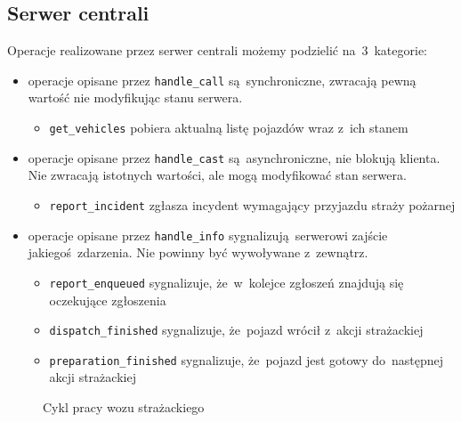\documentclass{article}
\begin{document}
\subsection{Serwer centrali}
Operacje realizowane przez serwer centrali możemy podzielić na~3~kategorie:
\begin{itemize}
	\item operacje opisane przez \texttt{handle\_call} są~synchroniczne, zwracają pewną wartość nie modyfikując stanu serwera.
	\begin{itemize}
		\item \texttt{get\_vehicles} pobiera aktualną listę pojazdów wraz z~ich stanem
	\end{itemize}

	\item operacje opisane przez \texttt{handle\_cast} są~asynchroniczne, nie blokują klienta. Nie zwracają istotnych wartości, ale mogą modyfikować stan serwera.
	\begin{itemize}
		\item \texttt{report\_incident} zgłasza incydent wymagający przyjazdu straży pożarnej
	\end{itemize}

	\item operacje opisane przez \texttt{handle\_info} sygnalizują serwerowi zajście jakiegoś zdarzenia. Nie powinny być wywoływane z~zewnątrz.
	\begin{itemize}
		\item \texttt{report\_enqueued} sygnalizuje, że~w~kolejce zgłoszeń znajdują się oczekujące zgłoszenia
		\item \texttt{dispatch\_finished} sygnalizuje, że~pojazd wrócił z~akcji strażackiej
		\item \texttt{preparation\_finished} sygnalizuje, że~pojazd jest gotowy do~następnej akcji strażackiej
	\end{itemize}
\end{itemize}

\begin{figure}[H]
\caption{Cykl pracy wozu strażackiego}
\end{figure}
\end{document}
